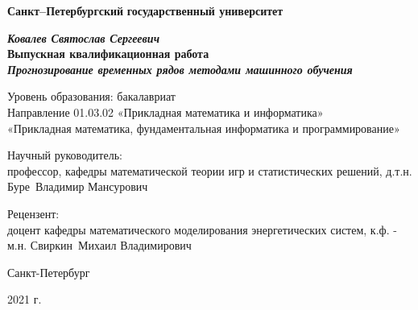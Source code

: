 
\begin{titlepage}
\begin{center}
\textbf{Санкт--Петербургский}
\textbf{государственный университет}

\vspace{35mm}

\textbf{\textit{\large Ковалев Святослав Сергеевич}} \\[8mm]
\textbf{\large Выпускная квалификационная работа}\\[3mm]
\textbf{\textit{\large Прогнозирование временных рядов методами машинного обучения}}

\vspace{20mm}
Уровень образования: бакалавриат\\
Направление 01.03.02 «Прикладная математика и информатика»\\
«Прикладная математика, фундаментальная информатика и программирование»\\


\begin{flushright}
{Научный руководитель:} \\
профессор, кафедры математической теории игр и статистических решений, д.т.н.  Буре~Владимир Мансурович
\end{flushright}
\begin{flushright}
{Рецензент:} \\
доцент кафедры математического моделирования энергетических систем, к.ф. - м.н.  Свиркин~Михаил Владимирович
\end{flushright}

\vfill 

{Санкт-Петербург}
\par{2021 г.}
\end{center}
\end{titlepage}
\restoregeometry
\addtocounter{page}{1}